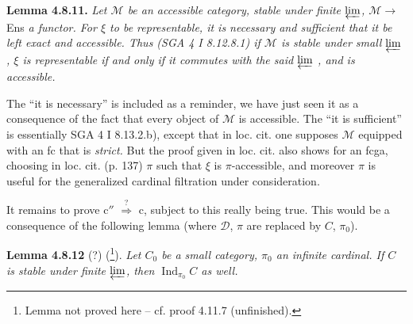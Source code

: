 \documentclass[11pt]{article}
\newcommand{\printedpage}[1]{\marginpar{\footnotesize p.~#1}}
\newcommand{\msp}[1]{\marginpar{\footnotesize [#1]}}
\newcommand{\Ind}{\operatorname{Ind}}
\newcommand{\cM}{\mathcal{M}}
\newcommand{\cD}{\mathcal{D}}
\begin{document}
\textbf{Lemma 4.8.11.} \textit{Let $\cM$ be an accessible category, stable under finite $\varprojlim$, $\cM \longrightarrow$} Ens \textit{a functor. For $\xi$ to be representable, it is necessary and sufficient that it be left exact and accessible. Thus (SGA 4 I 8.12.8.1) if $\cM$ is stable under small $\varprojlim$ , $\xi$ is representable if and only if it commutes with the said $\varprojlim$ , and is accessible.}


\printedpage{75}

\msp{page 211}

The ``it is necessary'' is included as a reminder, we have just seen it as a consequence of the fact that every object of $\cM$ is accessible. The ``it is sufficient'' is essentially SGA 4 I 8.13.2.b), except that in loc. cit. one supposes $\cM$ equipped with an fc that is \textit{strict.} But the proof given in loc. cit. also shows for an fcga, choosing in loc. cit. (p. 137) $\pi$ such that $\xi$ is $\pi$-accessible, and moreover $\pi$ is useful for the generalized cardinal filtration under consideration.

It remains to prove c$''$ $\overset{?}{\Longrightarrow}$ c, subject to this really being true. This would be a consequence of the following lemma (where $\cD$, $\pi$ are replaced by $C$, $\pi_0$).

\textbf{Lemma 4.8.12} (?) (\footnote[88]{Lemma not proved here -- cf. proof 4.11.7 (unfinished).}). \textit{Let $C_0$ be a small category, $\pi_0$ an infinite cardinal. If $C$ is stable under finite $\varprojlim$, then $\Ind_{\pi_0}C$ as well.} %
\end{document}
